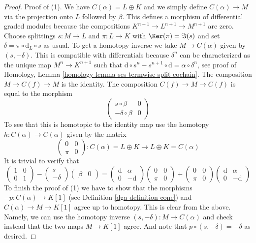\begin{proof}

Proof of (1). We have $C(\alpha) = L \oplus K$ and we simply define
$C(\alpha) \to M$ via the projection onto $L$ followed by $\beta$.
This defines a morphism of differential graded modules because the
compositions $K^{n + 1} \to L^{n + 1} \to M^{n + 1}$ are zero.
Choose splittings $s : M \to L$ and $\pi : L \to K$ with
$\Ker(\pi) = \Im(s)$ and set
$\delta = \pi \circ \text{d}_L \circ s$ as usual.
To get a homotopy inverse we take
$M \to C(\alpha)$ given by $(s , -\delta)$. This is compatible with
differentials because $\delta^n$ can be characterized as the
unique map $M^n \to K^{n + 1}$ such that
$\text{d} \circ s^n - s^{n + 1} \circ \text{d} = \alpha \circ \delta^n$,
see proof of
Homology, Lemma \ref{homology-lemma-ses-termwise-split-cochain}.
The composition $M \to C(f) \to M$ is the identity.
The composition $C(f) \to M \to C(f)$ is equal to the morphism
$$
\left(
\begin{matrix}
s \circ \beta & 0 \\
-\delta \circ \beta & 0
\end{matrix}
\right)
$$
To see that this is homotopic to the identity map
use the homotopy $h : C(\alpha) \to C(\alpha)$
given by the matrix
$$
\left(
\begin{matrix}
0 & 0 \\
\pi & 0
\end{matrix}
\right) :
C(\alpha) = L \oplus K
\to
L \oplus K = C(\alpha)
$$
It is trivial to verify that
$$
\left(
\begin{matrix}
1 & 0 \\
0 & 1
\end{matrix}
\right)
-
\left(
\begin{matrix}
s \\
-\delta
\end{matrix}
\right)
\left(
\begin{matrix}
\beta & 0
\end{matrix}
\right)
=
\left(
\begin{matrix}
\text{d} & \alpha \\
0 & -\text{d}
\end{matrix}
\right)
\left(
\begin{matrix}
0 & 0 \\
\pi & 0
\end{matrix}
\right)
+
\left(
\begin{matrix}
0 & 0 \\
\pi & 0
\end{matrix}
\right)
\left(
\begin{matrix}
\text{d} & \alpha \\
0 & -\text{d}
\end{matrix}
\right)
$$
To finish the proof of (1) we have to show that the morphisms
$-p : C(\alpha) \to K[1]$ (see
Definition \ref{dga-definition-cone})
and $C(\alpha) \to M \to K[1]$ agree up
to homotopy. This is clear from the above. Namely, we can use the homotopy
inverse $(s, -\delta) : M \to C(\alpha)$
and check instead that the two maps
$M \to K[1]$ agree. And note that
$p \circ (s, -\delta) = -\delta$ as desired.


\end{proof}
